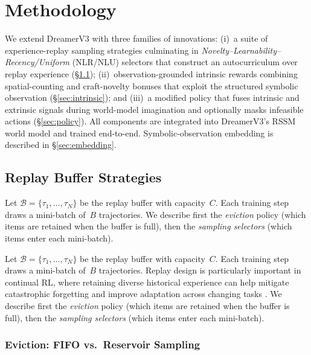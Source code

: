\documentclass{article}
\begin{document}
\section{Methodology}
\label{sec:method}

We extend DreamerV3 with three families of innovations:
(i)~a suite of experience-replay sampling strategies culminating in
\emph{Novelty--Learnability--Recency/Uniform} (NLR/NLU) selectors
that construct an autocurriculum over replay experience
(\S\ref{sec:replay});
(ii)~observation-grounded intrinsic rewards combining spatial-counting
and craft-novelty bonuses that exploit the structured symbolic
observation (\S\ref{sec:intrinsic});
and (iii)~a modified policy that fuses intrinsic and extrinsic
signals during world-model imagination and optionally masks infeasible
actions (\S\ref{sec:policy}).
All components are integrated into DreamerV3's RSSM world model and
trained end-to-end.  Symbolic-observation embedding is described in
\S\ref{sec:embedding}.

\subsection{Replay Buffer Strategies}
\label{sec:replay}

Let $\mathcal{B}=\{\tau_1,\dots,\tau_N\}$ be the replay buffer with
capacity~$C$.  Each training step draws a mini-batch of~$B$
trajectories.  We describe first the \emph{eviction} policy (which
items are retained when the buffer is full), then the
\emph{sampling selectors} (which items enter each mini-batch).

Let $\mathcal{B}=\{\tau_1,\dots,\tau_N\}$ be the replay buffer with
capacity~$C$. Each training step draws a mini-batch of~$B$
trajectories. Replay design is particularly important in continual RL,
where retaining diverse historical experience can help mitigate
catastrophic forgetting and improve adaptation across changing tasks
\cite{rolnick2019experience,yang2024augmenting}. We describe first the
\emph{eviction} policy (which items are retained when the buffer is
full), then the \emph{sampling selectors} (which items enter each
mini-batch).

\subsubsection{Eviction: FIFO vs.\ Reservoir Sampling}
\label{sec:eviction}
\end{document}
